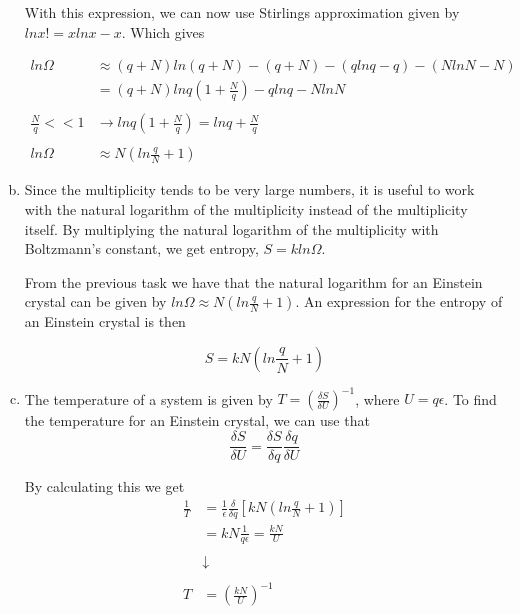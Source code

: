 \documentclass[a4paper,norsk,12pt,oneside]{article}
\begin{document}
\begin{enumerate}[a)]
         With this expression, we can now use Stirlings approximation given by 
        \(ln x! = xlnx - x\). Which gives

        \begin{align*}
            ln\Omega &\approx (q+N)ln(q+N) - (q+N) - (q lnq - q) - (N lnN -N)\\
            &= (q + N)lnq(1 + \frac{N}{q}) - qlnq - NlnN \\ \\
            \frac{N}{q} << 1  &\rightarrow  lnq(1 + \frac{N}{q}) = lnq + \frac{N}{q} \\ \\
            ln\Omega &\approx N(ln \frac{q}{N} + 1)
        \end{align*}

    \item

        Since the multiplicity tends to be very large numbers, it is useful to work with
        the natural logarithm of the multiplicity instead of the multiplicity itself. 
        By multiplying the natural logarithm of the multiplicity with Boltzmann's constant,
        we get entropy, \(S = kln\Omega\). 

        From the previous task we have that the natural logarithm for an Einstein crystal 
        can be given by \(ln\Omega \approx N(ln \frac{q}{N} + 1) \). An expression for the
        entropy of an Einstein crystal is then

        \begin{equation*}
           S =  kN(ln \frac{q}{N} + 1)
        \end{equation*}

    \item

        The temperature of a system is given by \(T = \left ( \frac{\delta S}{\delta 
        U}\right ) ^{-
        1} \), where \(U = q\epsilon\). To find the temperature for an Einstein crystal, we 
        can use that
        \begin{equation*}
            \frac{\delta S}{\delta U} = \frac{\delta S}{\delta q} \frac{\delta q}{\delta U}
        \end{equation*}

        By calculating this we get
        \begin{align*}
            \frac{1}{T} &= \frac{1}{\epsilon} \frac{\delta}{\delta q}[kN(ln \frac{q}{N} + 
            1)]\\
            & = kN\frac{1}{q\epsilon} = \frac{kN}{U}\\ \\
            &\downarrow \\ \\
            T &= \left ( \frac{kN}{U} \right )^{-1}
        \end{align*}


\end{enumerate}
\end{document}
